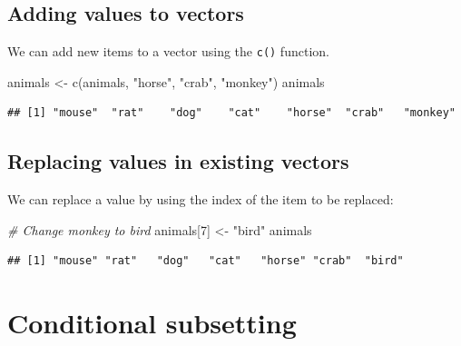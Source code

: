 \documentclass[
]{book}
\newenvironment{Shaded}{\begin{snugshade}}{\end{snugshade}}
\newcommand{\CommentTok}[1]{\textcolor[rgb]{0.56,0.35,0.01}{\textit{#1}}}
\newcommand{\DecValTok}[1]{\textcolor[rgb]{0.00,0.00,0.81}{#1}}
\newcommand{\FunctionTok}[1]{\textcolor[rgb]{0.00,0.00,0.00}{#1}}
\newcommand{\NormalTok}[1]{#1}
\newcommand{\OtherTok}[1]{\textcolor[rgb]{0.56,0.35,0.01}{#1}}
\newcommand{\StringTok}[1]{\textcolor[rgb]{0.31,0.60,0.02}{#1}}
\begin{document}
\hypertarget{adding-values-to-vectors}{%
\subsection*{Adding values to vectors}\label{adding-values-to-vectors}}

We can add new items to a vector using the \texttt{c()} function.

\begin{Shaded}
\begin{Highlighting}[]
\NormalTok{animals }\OtherTok{\textless{}{-}} \FunctionTok{c}\NormalTok{(animals, }\StringTok{"horse"}\NormalTok{, }\StringTok{"crab"}\NormalTok{, }\StringTok{"monkey"}\NormalTok{)}
\NormalTok{animals}
\end{Highlighting}
\end{Shaded}

\begin{verbatim}
## [1] "mouse"  "rat"    "dog"    "cat"    "horse"  "crab"   "monkey"
\end{verbatim}

\hypertarget{replacing-values-in-existing-vectors}{%
\subsection*{Replacing values in existing vectors}\label{replacing-values-in-existing-vectors}}

We can replace a value by using the index of the item to be replaced:

\begin{Shaded}
\begin{Highlighting}[]
\CommentTok{\# Change monkey to bird}
\NormalTok{animals[}\DecValTok{7}\NormalTok{] }\OtherTok{\textless{}{-}} \StringTok{"bird"}
\NormalTok{animals}
\end{Highlighting}
\end{Shaded}

\begin{verbatim}
## [1] "mouse" "rat"   "dog"   "cat"   "horse" "crab"  "bird"
\end{verbatim}

\hypertarget{conditional-subsetting}{%
\section{Conditional subsetting}\label{conditional-subsetting}}
\end{document}
